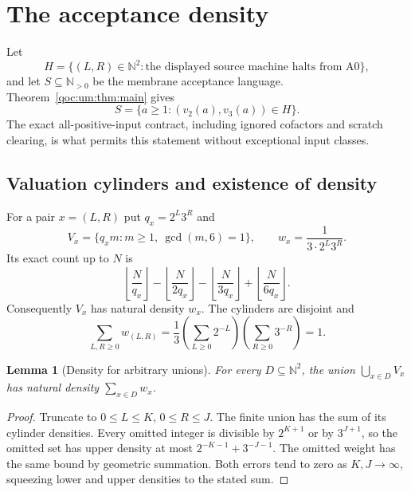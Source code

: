 \documentclass[11pt,letterpaper]{article}
\newtheorem{lemma}[theorem]{Lemma}
\theoremstyle{definition}
\theoremstyle{remark}
\newcommand{\N}{\mathbb N}
\begin{document}
\section{The acceptance density}\label{qoc:um:sec:density}
Let
\[
 H=\{(L,R)\in\N^2:\text{the displayed source machine halts from }\mathrm A0\},
\]
and let $S\subseteq\N_{>0}$ be the membrane acceptance language. Theorem~\ref{qoc:um:thm:main} gives
\begin{equation}\label{qoc:um:eq:language}
 S=\{a\geq1:(v_2(a),v_3(a))\in H\}.
\end{equation}
The exact all-positive-input contract, including ignored cofactors and scratch clearing, is what permits this statement without exceptional input classes.

\subsection{Valuation cylinders and existence of density}
For a pair $x=(L,R)$ put $q_x=2^L3^R$ and
\[
 V_x=\{q_xm:m\geq1,\ \gcd(m,6)=1\},\qquad
 w_x=\frac{1}{3\cdot2^L3^R}.
\]
Its exact count up to $N$ is
\begin{equation}\label{qoc:um:eq:cylcount}
 \left\lfloor\frac N{q_x}\right\rfloor-
 \left\lfloor\frac N{2q_x}\right\rfloor-
 \left\lfloor\frac N{3q_x}\right\rfloor+
 \left\lfloor\frac N{6q_x}\right\rfloor.
\end{equation}
Consequently $V_x$ has natural density $w_x$. The cylinders are disjoint and
\[
 \sum_{L,R\geq0}w_{(L,R)}=
 \frac13\left(\sum_{L\geq0}2^{-L}\right)
 \left(\sum_{R\geq0}3^{-R}\right)=1.
\]

\begin{lemma}[Density for arbitrary unions]\label{qoc:um:lem:cyl}
For every $D\subseteq\N^2$, the union $\bigcup_{x\in D}V_x$ has natural density $\sum_{x\in D}w_x$.
\end{lemma}
\begin{proof}
Truncate to $0\leq L\leq K$, $0\leq R\leq J$. The finite union has the sum of its cylinder densities. Every omitted integer is divisible by $2^{K+1}$ or by $3^{J+1}$, so the omitted set has upper density at most
$2^{-K-1}+3^{-J-1}$. The omitted weight has the same bound by geometric summation. Both errors tend to zero as $K,J\to\infty$, squeezing lower and upper densities to the stated sum.
\end{proof}
\end{document}
